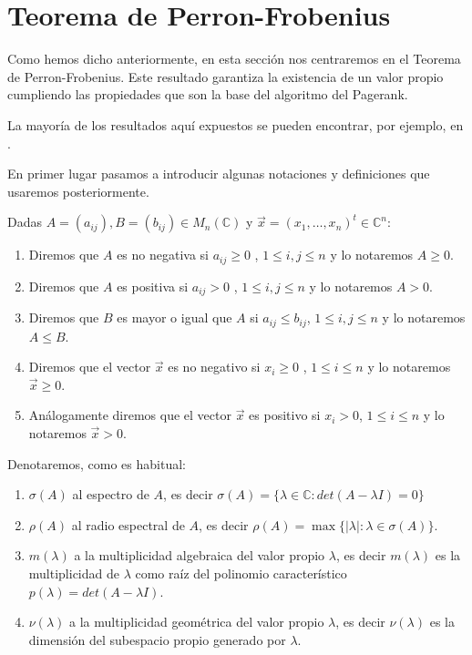 \documentclass[size=a4, parskip=half, titlepage=false, toc=flat, toc=bib, 12pt]{scrartcl}
\theoremstyle{theorem-style}
\theoremstyle{definition-style}
\theoremstyle{remark-style}
\theoremstyle{example-style}
\theoremstyle{definition-style}
\theoremstyle{remark-style}
\begin{document}
\section{Teorema de Perron-Frobenius}

Como hemos dicho anteriormente, en esta sección nos centraremos en el Teorema de Perron-Frobenius. Este resultado garantiza la existencia de un valor propio cumpliendo las propiedades que son la base del algoritmo del Pagerank.

La mayoría de los resultados aquí expuestos se pueden encontrar, por ejemplo, en \cite{algebralineal}.

En primer lugar pasamos a introducir algunas notaciones y definiciones que usaremos posteriormente.

Dadas $A = (a_{ij}),B = (b_{ij}) \in M_n(\mathbb{C})$ y $\vec{x} = (x_1, \dots, x_n)^t\in \mathbb{C}^n$:
\begin{enumerate}
\item Diremos que $A$ es no negativa si $a_{ij}\geq 0$ , $1 \leq i,j \leq n$ y lo notaremos
$A\geq 0$.
\item Diremos que $A$ es positiva si $a_{ij} > 0$ , $1 \leq i, j \leq n$ y lo notaremos $A > 0$.
\item Diremos que $B$ es mayor o igual que $A$ si $a_{ij} \leq b_{ij}$, $1 \leq i,j \leq n$ y lo notaremos $A \leq B$.
\item Diremos que el vector $\vec{x}$ es no negativo si $x_i \geq 0$ , $1 \leq i \leq n$ y lo notaremos $\vec{x} \geq 0$.
\item Análogamente diremos que el vector $\vec{x}$ es positivo si $x_i > 0$, $1 \leq i \leq n$ y lo notaremos $\vec{x} > 0$.
\end{enumerate}

Denotaremos, como es habitual:
\begin{enumerate}
\item $\sigma (A)$ al espectro de $A$, es decir $\sigma(A) = \{ \lambda \in \mathbb{C} : det(A - \lambda I)= 0\}$
\item $\rho(A)$ al radio espectral de $A$, es decir $\rho(A) = \max\{|\lambda| : \lambda \in \sigma(A) \}$.
\item $m(\lambda)$ a la multiplicidad algebraica del valor propio $\lambda$, es decir $m(\lambda)$ es la multiplicidad de $\lambda$ como raíz del polinomio característico $p(\lambda) = det(A - \lambda I)$.
\item $\nu(\lambda)$ a la multiplicidad geométrica del valor propio $\lambda$, es decir $\nu(\lambda)$ es la dimensión del subespacio propio generado por $\lambda$.
\end{enumerate}
\end{document}
